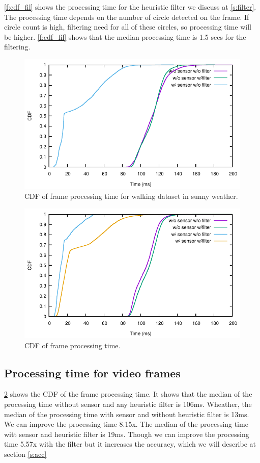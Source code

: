 \ref{f:cdf_fil} shows the processing time for the heuristic filter we discuss at \ref{s:filter}.
The processing time depends on the number of circle detected on the frame.
If circle count is high, filtering need for all of these circles, so processing time will be higher.
\ref{f:cdf_fil} shows that the median processing time is 1.5 secs for the filtering. 

\begin{figure}[h!]
\centering
\includegraphics[width=5.2in]{plots/sunny_cdf_time.pdf}
\caption{CDF of frame processing time for walking dataset in sunny weather.}
\label{f:cdf_sunny}
\end{figure}

\begin{figure}[h!]
\centering
\includegraphics[width=5.2in]{plots/walk_cdf_time.pdf}
\caption{CDF of frame processing time.}
\label{f:cdf_time}
\end{figure}

\subsection{Processing time for video frames}
\ref{f:cdf_time} shows the CDF of the frame processing time.
It shows that the median of the processing time without sensor and any heuristic filter is 106ms.
Wheather, the median of the processing time with sensor and without heuristic filter is 13ms.
We can improve the processing time 8.15x.
The median of the processing time witt sensor and heuristic filter is 19ms.
Though we can improve the processing time 5.57x with the filter but it increases the accuracy, which we will describe at section \ref{s:acc}

